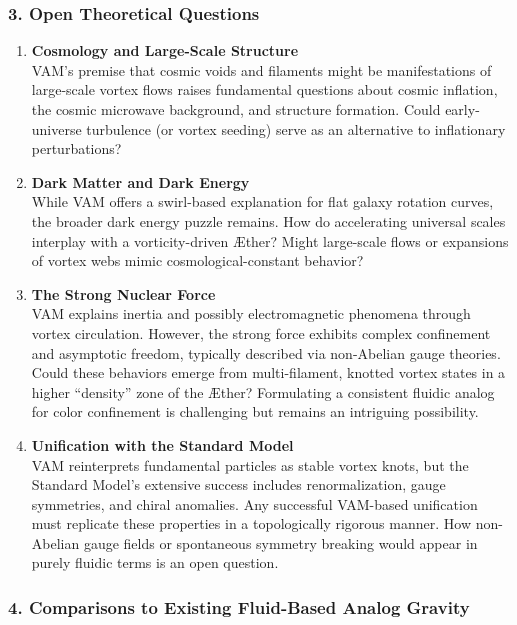 \subsubsection*{3. Open Theoretical Questions}

\begin{enumerate}
    \item \textbf{Cosmology and Large-Scale Structure} \\
    VAM’s premise that cosmic voids and filaments might be manifestations of large-scale vortex flows raises fundamental questions about cosmic inflation, the cosmic microwave background, and structure formation. Could early-universe turbulence (or vortex seeding) serve as an alternative to inflationary perturbations?

    \item \textbf{Dark Matter and Dark Energy} \\
    While VAM offers a swirl-based explanation for flat galaxy rotation curves, the broader dark energy puzzle remains. How do accelerating universal scales interplay with a vorticity-driven Æther? Might large-scale flows or expansions of vortex webs mimic cosmological-constant behavior?

    \item \textbf{The Strong Nuclear Force} \\
    VAM explains inertia and possibly electromagnetic phenomena through vortex circulation. However, the strong force exhibits complex confinement and asymptotic freedom, typically described via non-Abelian gauge theories. Could these behaviors emerge from multi-filament, knotted vortex states in a higher “density” zone of the Æther? Formulating a consistent fluidic analog for color confinement is challenging but remains an intriguing possibility.

    \item \textbf{Unification with the Standard Model} \\
    VAM reinterprets fundamental particles as stable vortex knots, but the Standard Model’s extensive success includes renormalization, gauge symmetries, and chiral anomalies. Any successful VAM-based unification must replicate these properties in a topologically rigorous manner. How non-Abelian gauge fields or spontaneous symmetry breaking would appear in purely fluidic terms is an open question.
\end{enumerate}

\subsubsection*{4. Comparisons to Existing Fluid-Based Analog Gravity}

